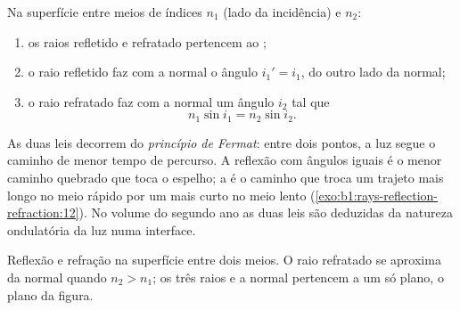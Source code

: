 \begin{theorem}\label{thm:b1:rays-reflection-refraction:snell}
Na superfície entre meios de índices $n_1$ (lado da incidência) e
$n_2$:
\begin{enumerate}
  \item os raios refletido e refratado pertencem ao ;
  \item o raio refletido faz com a normal o ângulo $i_1' = i_1$,
        do outro lado da normal;
  \item o raio refratado faz com a normal um ângulo $i_2$ tal que
        \[
        n_1 \sin i_1 = n_2 \sin i_2 .
        \]
\end{enumerate}
\end{theorem}
\admitted

\begin{remark}\label{rem:b1:rays-reflection-refraction:fermat}
As duas leis decorrem do \emph{princípio de Fermat}: entre dois pontos,
a luz segue o caminho de menor tempo de percurso. A reflexão com ângulos iguais
é o menor caminho quebrado que toca o espelho; a  é o
caminho que troca um trajeto mais longo no meio rápido por um mais curto
no meio lento (\cref{exo:b1:rays-reflection-refraction:12}).
No volume do segundo ano as duas leis são deduzidas da natureza
ondulatória da luz numa interface.
\end{remark}

\begin{omfigure}

{\small Reflexão e refração na superfície entre dois meios.
O raio refratado se aproxima da normal quando $n_2 > n_1$; os três
raios e a normal pertencem a um só plano, o plano da figura.}
\end{omfigure}

